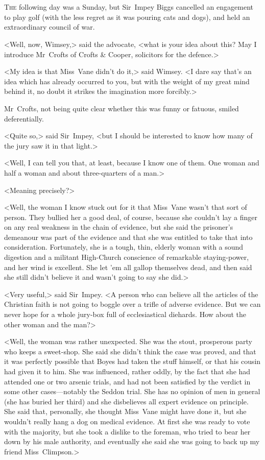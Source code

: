 \chapter[Chapter \thechapter]{}
\lettrine{T}{he} following day was a Sunday, but Sir~Impey Biggs cancelled an engagement to play golf (with the less regret as it was pouring cats and dogs), and held an extraordinary council of war.

\zz
<Well, now, Wimsey,> said the advocate, <what is your idea about this? May I introduce Mr~Crofts of Crofts \& Cooper, solicitors for the defence.>

<My idea is that Miss~Vane didn't do it,> said Wimsey. <I dare say that's an idea which has already occurred to you, but with the weight of my great mind behind it, no doubt it strikes the imagination more forcibly.>

Mr~Crofts, not being quite clear whether this was funny or fatuous, smiled deferentially.

<Quite so,> said Sir~Impey, <but I should be interested to know how many of the jury saw it in that light.>

<Well, I can tell you that, at least, because I know one of them. One woman and half a woman and about three-quarters of a man.>

<Meaning precisely?>

<Well, the woman I know stuck out for it that Miss~Vane wasn't that sort of person. They bullied her a good deal, of course, because she couldn't lay a finger on any real weakness in the chain of evidence, but she said the prisoner's demeanour was part of the evidence and that she was entitled to take that into consideration. Fortunately, she is a tough, thin, elderly woman with a sound digestion and a militant High-Church conscience of remarkable staying-power, and her wind is excellent. She let 'em all gallop themselves dead, and then said she still didn't believe it and wasn't going to say she did.>

<Very useful,> said Sir~Impey. <A person who can believe all the articles of the Christian faith is not going to boggle over a trifle of adverse evidence. But we can never hope for a whole jury-box full of ecclesiastical diehards. How about the other woman and the man?>

<Well, the woman was rather unexpected. She was the stout, prosperous party who keeps a sweet-shop. She said she didn't think the case was proved, and that it was perfectly possible that Boyes had taken the stuff himself, or that his cousin had given it to him. She was influenced, rather oddly, by the fact that she had attended one or two arsenic trials, and had not been satisfied by the verdict in some other cases—notably the Seddon trial. She has no opinion of men in general (she has buried her third) and she disbelieves all expert evidence on principle. She said that, personally, she thought Miss~Vane might have done it, but she wouldn't really hang a dog on medical evidence. At first she was ready to vote with the majority, but she took a dislike to the foreman, who tried to bear her down by his male authority, and eventually she said she was going to back up my friend Miss~Climpson.>

